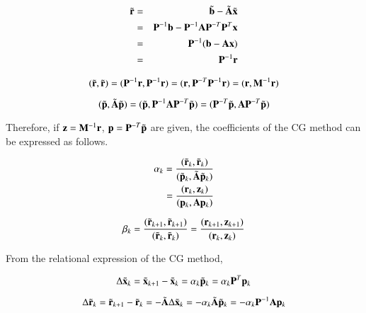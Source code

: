 \begin{eqnarray}
\tilde{\mathbf{r}}
&=&\tilde{\mathbf{b}}-\tilde{\mathbf{A}}\tilde{\mathbf{x}}\\
&=&\mathbf{P}^{-1}\mathbf{b}-\mathbf{P}^{-1}\mathbf{A}\mathbf{P}^{-T}\mathbf{P}^T\mathbf{x}\\
&=&\mathbf{P}^{-1}(\mathbf{b}-\mathbf{A}\mathbf{x})\\
&=&\mathbf{P}^{-1}\mathbf{r}
\end{eqnarray}


\begin{equation}
(\tilde{\mathbf{r}},\tilde{\mathbf{r}})=(\mathbf{P}^{-1}\mathbf{r},\mathbf{P}^{-1}\mathbf{r})=(\mathbf{r},\mathbf{P}^{-T}\mathbf{P}^{-1}\mathbf{r})=(\mathbf{r},\mathbf{M}^{-1}\mathbf{r})
\end{equation}


\begin{equation}
(\tilde{\mathbf{p}},\tilde{\mathbf{A}}\tilde{\mathbf{p}})=(\tilde{\mathbf{p}},\mathbf{P}^{-1}\mathbf{A}\mathbf{P}^{-T}\tilde{\mathbf{p}})=(\mathbf{P}^{-T}\tilde{\mathbf{p}},\mathbf{A}\mathbf{P}^{-T}\tilde{\mathbf{p}})
\end{equation}

Therefore, if $\mathbf{z}=\mathbf{M}^{-1}\mathbf{r}$, $\mathbf{p}=\mathbf{P}^{-T}\tilde{\mathbf{p}}$ are given, the coefficients of the CG method can be expressed as follows.

\begin{eqnarray}
\alpha_k
=\frac{(\tilde{\mathbf{r}}_k,\tilde{\mathbf{r}}_k)}{(\tilde{\mathbf{p}}_k,\tilde{\mathbf{A}}\tilde{\mathbf{p}}_k)}\\
=\frac{(\mathbf{r}_k,\mathbf{z}_k)}{(\mathbf{p}_k,\mathbf{A}\mathbf{p}_k)}
\end{eqnarray}


\begin{equation}
\beta_k=\frac{(\tilde{\mathbf{r}}_{k+1},\tilde{\mathbf{r}}_{k+1})}{(\tilde{\mathbf{r}}_k,\tilde{\mathbf{r}}_k)}=\frac{(\mathbf{r}_{k+1},\mathbf{z}_{k+1})}{(\mathbf{r}_k,\mathbf{z}_k)}
\end{equation}

From the relational expression of the CG method,

\begin{equation}
\Delta\tilde{\mathbf{x}}_k=\tilde{\mathbf{x}}_{k+1}-\tilde{\mathbf{x}}_k=\alpha_k\tilde{\mathbf{p}}_k=\alpha_k\mathbf{P}^T\mathbf{p}_k
\end{equation}


\begin{equation}
\Delta\tilde{\mathbf{r}}_k=\tilde{\mathbf{r}}_{k+1}-\tilde{\mathbf{r}}_k=-\tilde{\mathbf{A}}\Delta\tilde{\mathbf{x}}_k=-\alpha_k\tilde{\mathbf{A}}\tilde{\mathbf{p}}_k=-\alpha_k\mathbf{P}^{-1}\mathbf{A}\mathbf{p}_k
\end{equation}


